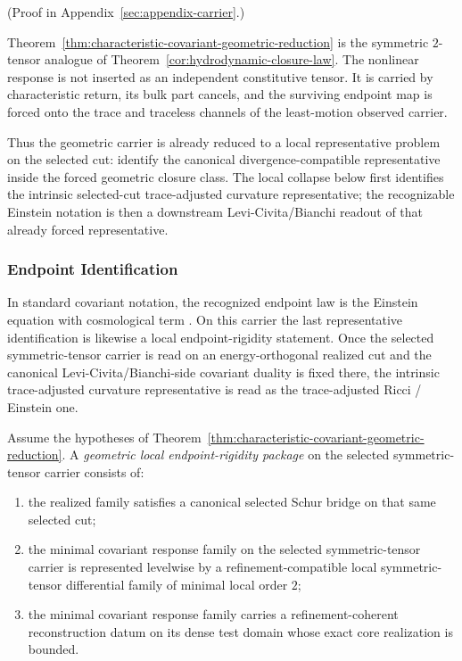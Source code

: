 (Proof in Appendix~\ref{sec:appendix-carrier}.)

\begin{remark}
\label{rem:characteristic-path-origin-of-geometric-response}
Theorem~\ref{thm:characteristic-covariant-geometric-reduction} is the symmetric
\(2\)-tensor analogue of Theorem~\ref{cor:hydrodynamic-closure-law}. The
nonlinear response is not inserted as an independent constitutive tensor. It is
carried by characteristic return, its bulk part cancels, and the surviving
endpoint map is forced onto the trace and traceless channels of the least-motion
observed carrier.
\end{remark}

Thus the geometric carrier is already reduced to a local representative
problem on the selected cut: identify the canonical divergence-compatible
representative inside the forced geometric closure class. The local collapse
below first identifies the intrinsic selected-cut trace-adjusted curvature
representative; the recognizable Einstein notation is then a downstream
Levi-Civita/Bianchi readout of that already forced representative.

\subsubsection{Endpoint Identification}

In standard covariant notation, the recognized endpoint law is the Einstein
equation with cosmological term \cite{Einstein1915,Wald1984}. On this carrier
the last representative identification is likewise a local endpoint-rigidity
statement. Once the selected symmetric-tensor carrier is read on an
energy-orthogonal realized cut and the canonical Levi-Civita/Bianchi-side
covariant duality is fixed there, the intrinsic trace-adjusted curvature
representative is read as the trace-adjusted Ricci / Einstein one.

\begin{definition}
\label{def:geometric-local-endpoint-rigidity-package}
Assume the hypotheses of
Theorem~\ref{thm:characteristic-covariant-geometric-reduction}. A
\emph{geometric local endpoint-rigidity package} on the selected
symmetric-tensor carrier consists of:
\begin{enumerate}[label=(\roman*),itemsep=0.2em]
\item the realized family satisfies a canonical selected Schur bridge on that
      same selected cut;
\item the minimal covariant response family on the selected symmetric-tensor
      carrier is represented levelwise by a refinement-compatible local
      symmetric-tensor differential family of minimal local order \(2\);
\item the minimal covariant response family carries a
      refinement-coherent reconstruction datum on its dense test domain whose
      exact core realization is bounded.
\end{enumerate}
\end{definition}

